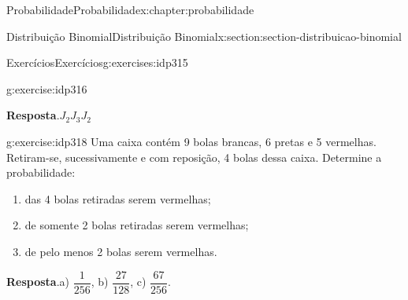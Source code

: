 \documentclass[oneside,10pt,]{book}
\newcommand{\blocktitlefont}{\relax}
\numberwithin{equation}{section}
\begin{document}
\begin{chapterptx}{Probabilidade}{}{Probabilidade}{}{}{x:chapter:probabilidade}
\begin{sectionptx}{Distribuição Binomial}{}{Distribuição Binomial}{}{}{x:section:section-distribuicao-binomial}
\begin{exercises-subsection}{Exercícios}{}{Exercícios}{}{}{g:exercises:idp315}
\begin{divisionexercise}{1}{}{}{g:exercise:idp316}
%
\par\smallskip%
\noindent\textbf{\blocktitlefont Resposta}.\hypertarget{g:answer:idp317}{}\quad{}\(J_2J_3J_2\)%
\end{divisionexercise}%
\begin{divisionexercise}{2}{}{}{g:exercise:idp318}%
Uma caixa contém 9 bolas brancas, 6 pretas e 5 vermelhas. Retiram-se, sucessivamente e com reposição, 4 bolas dessa caixa. Determine a probabilidade:%
\begin{enumerate}[label=(\alph*)]
\item{}das 4 bolas retiradas serem vermelhas;%
\item{}de somente 2 bolas retiradas serem vermelhas;%
\item{}de pelo menos 2 bolas serem vermelhas.%
\end{enumerate}
%
\par\smallskip%
\noindent\textbf{\blocktitlefont Resposta}.\hypertarget{g:answer:idp319}{}\quad{}a) \(\dfrac{1}{256}\), b) \(\dfrac{27}{128}\), c) \(\dfrac{67}{256}\).%
\end{divisionexercise}%
\end{exercises-subsection}
\end{sectionptx}
\end{chapterptx}
%
%
\typeout{************************************************}
\typeout{************************************************}
%
\end{document}

